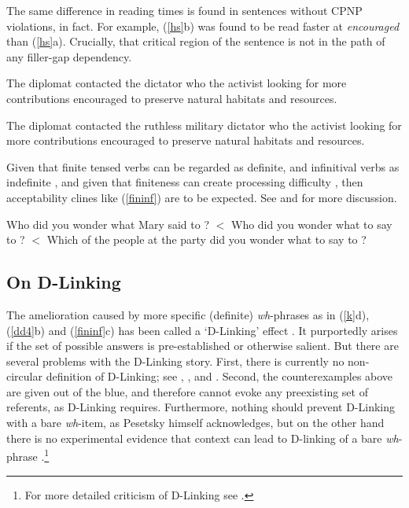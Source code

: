\documentclass[output=paper
                ,modfonts
                ,nonflat
	        ,collection
	        ,collectionchapter
	        ,collectiontoclongg
 	        ,biblatex
                ,babelshorthands
                ,newtxmath
                ,draftmode
                ,colorlinks, citecolor=brown
]{./langsci/langscibook}
\begin{document}
\eal \label{dd4}
\zl



\noindent
The same difference in reading times  is found in sentences without CPNP violations, in fact. For example,  (\ref{hs}b) was found to be read faster at \emph{encouraged} than (\ref{hs}a). Crucially, that critical region of the sentence is not in the path of any filler-gap dependency.
 
\eal \label{hs}
 \ex The diplomat contacted the dictator who the activist looking for more contributions encouraged to preserve natural habitats and resources.
 
 \ex The diplomat contacted the ruthless military dictator who the activist looking for more contributions encouraged to preserve natural habitats and resources.
 \zl



Given that  finite tensed verbs can be regarded as definite, and infinitival verbs as indefinite \citep{partee84}, and given that finiteness can create processing difficulty 
 \citep{kluender92,gibson0000}, then acceptability clines like 
(\ref{fininf}) are to be expected. See \citet[Chapter 5]{levhubook} and \citet[308]{levine17} for more discussion.

\eal \label{fininf}
\ex Who did you wonder what Mary said to \spc?  $<$
\ex Who did you wonder what to say to \spc?  $<$
\ex Which of the people at the party did you wonder what to say to \spc? 
\zl

\subsection{On D-Linking}

The amelioration caused by more specific (definite) \emph{wh}-phrases as in  (\ref{k}d), (\ref{dd4}b) and (\ref{fininf}c)  has been called a `D-Linking' effect  \citep{pesetskydlink,pesetskybook}. It purportedly arises if the set of possible answers is pre-established or otherwise salient. But there are several problems with the D-Linking story.   First, there is currently no non-circular definition of D-Linking; see 
\citet[16]{pesetskybook},
 \citet[247--250]{ginzsag}, 
 \citet[33, 39]{chung94} and
\citet[242, 268--271]{levhubook}. Second, the counterexamples above are given out of the blue, and therefore cannot evoke any preexisting set of referents, as D-Linking 
requires.   Furthermore, nothing should prevent D-Linking with a bare \emph{wh}-item, as Pesetsky himself acknowledges, but on the other hand there is no experimental evidence that context can lead to D-linking of a bare \emph{wh}-phrase \citep{sprousediss07,villata}.\footnote{For more detailed criticism of D-Linking see \citet{hof2007}.}
\end{document}
